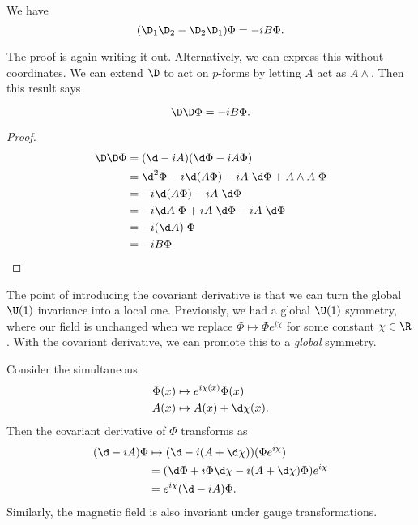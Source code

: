 \documentclass[a4paper]{article}
\begin{document}
\begin{prop}
  We have
  \[
    (\D_1 \D_2 - \D_2 \D_1) \Phi = - i B \Phi.
  \]
\end{prop}

The proof is again writing it out. Alternatively, we can express this without coordinates. We can extend $\D$ to act on $p$-forms by letting $A$ act as $A \wedge$. Then this result says
\begin{prop}
  \[
    \D \D \Phi = -i B \Phi.
  \]
\end{prop}

\begin{proof}
  \begin{align*}
    \D \D \Phi &= (\d - iA) (\d \Phi - iA\Phi)\\
    &= \d^2 \Phi - i \d (A \Phi) - iA\;\d \Phi + A \wedge A\;\Phi\\
    &= -i \d (A \Phi) - i A \;\d \Phi\\
    &= -i \d A\; \Phi + i A \;\d \Phi - i A\;\d \Phi\\
    &= -i (\d A)\; \Phi\\
    &= -i B \Phi
  \end{align*}
\end{proof}

The point of introducing the covariant derivative is that we can turn the global $\U(1)$ invariance into a local one. Previously, we had a global $\U(1)$ symmetry, where our field is unchanged when we replace $\Phi \mapsto \Phi e^{i \chi}$ for some constant $\chi \in \R$. With the covariant derivative, we can promote this to a \emph{global} symmetry.

Consider the simultaneous 
\begin{align*}
  \Phi(x) &\mapsto e^{i\chi(x)} \Phi(x)\\
  A(x) &\mapsto A(x) + \d \chi(x).
\end{align*}
Then the covariant derivative of $\Phi$ transforms as
\begin{align*}
  (\d - iA) \Phi &\mapsto (\d - i (A + \d \chi)) (\Phi e^{i \chi}) \\
  &= (\d \Phi + i \Phi \d \chi - i (A + \d \chi) \Phi) e^{i\chi} \\
  &= e^{i \chi} (\d - iA) \Phi.
\end{align*}
Similarly, the magnetic field is also invariant under gauge transformations.
\end{document}
